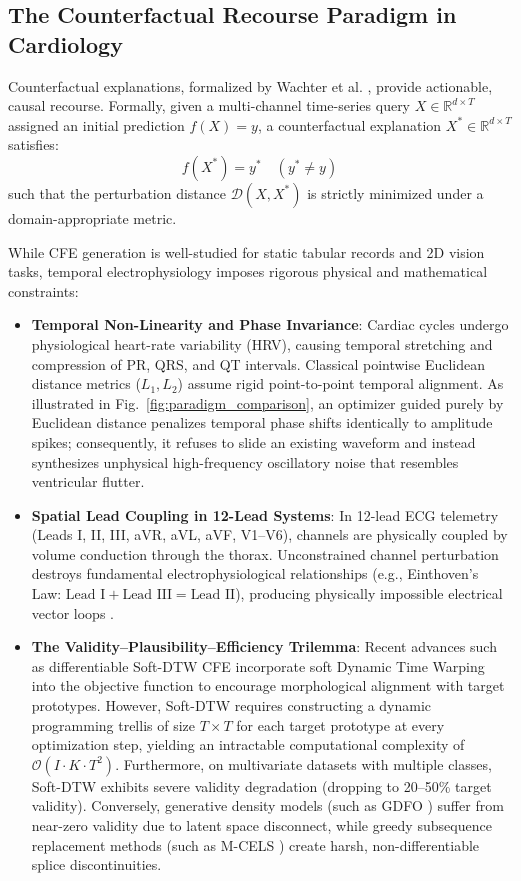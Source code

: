 \documentclass[conference]{IEEEtran}
\newcommand{\R}{\mathbb{R}}
\begin{document}
\subsection{The Counterfactual Recourse Paradigm in Cardiology}
Counterfactual explanations, formalized by Wachter et al. \cite{wachter2017counterfactual}, provide actionable, causal recourse. Formally, given a multi-channel time-series query $X \in \R^{d \times T}$ assigned an initial prediction $f(X) = y$, a counterfactual explanation $X^* \in \R^{d \times T}$ satisfies:
\begin{equation}
    f(X^*) = y^* \quad (y^* \neq y)
\end{equation}
such that the perturbation distance $\mathcal{D}(X, X^*)$ is strictly minimized under a domain-appropriate metric. 

While CFE generation is well-studied for static tabular records and 2D vision tasks, temporal electrophysiology imposes rigorous physical and mathematical constraints:
\begin{itemize}
    \item \textbf{Temporal Non-Linearity and Phase Invariance}: Cardiac cycles undergo physiological heart-rate variability (HRV), causing temporal stretching and compression of PR, QRS, and QT intervals. Classical pointwise Euclidean distance metrics ($L_1, L_2$) assume rigid point-to-point temporal alignment. As illustrated in Fig.~\ref{fig:paradigm_comparison}, an optimizer guided purely by Euclidean distance penalizes temporal phase shifts identically to amplitude spikes; consequently, it refuses to slide an existing waveform and instead synthesizes unphysical high-frequency oscillatory noise that resembles ventricular flutter.
    \item \textbf{Spatial Lead Coupling in 12-Lead Systems}: In 12-lead ECG telemetry (Leads I, II, III, aVR, aVL, aVF, V1--V6), channels are physically coupled by volume conduction through the thorax. Unconstrained channel perturbation destroys fundamental electrophysiological relationships (e.g., Einthoven's Law: $\text{Lead I} + \text{Lead III} = \text{Lead II}$), producing physically impossible electrical vector loops \cite{kashou2021einthoven}.
    \item \textbf{The Validity--Plausibility--Efficiency Trilemma}:
    Recent advances such as differentiable Soft-DTW CFE \cite{kostrzewa2026softdtw} incorporate soft Dynamic Time Warping into the objective function to encourage morphological alignment with target prototypes. However, Soft-DTW requires constructing a dynamic programming trellis of size $T \times T$ for each target prototype at every optimization step, yielding an intractable computational complexity of $\mathcal{O}(I \cdot K \cdot T^2)$. Furthermore, on multivariate datasets with multiple classes, Soft-DTW exhibits severe validity degradation (dropping to 20--50\% target validity). Conversely, generative density models (such as GDFO \cite{crabb2024gdfo}) suffer from near-zero validity due to latent space disconnect, while greedy subsequence replacement methods (such as M-CELS \cite{ates2021counterfactual}) create harsh, non-differentiable splice discontinuities.
\end{itemize}
\end{document}
